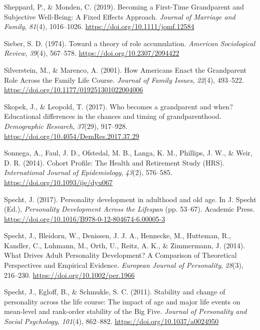 \documentclass[
  english,
  man,floatsintext]{apa7}
\begin{document}
\leavevmode\hypertarget{ref-sheppardBecomingFirstTimeGrandparent2019}{}%
Sheppard, P., \& Monden, C. (2019). Becoming a First-Time Grandparent and Subjective Well-Being: A Fixed Effects Approach. \emph{Journal of Marriage and Family}, \emph{81}(4), 1016--1026. \url{https://doi.org/10.1111/jomf.12584}

\leavevmode\hypertarget{ref-sieberTheoryRoleAccumulation1974}{}%
Sieber, S. D. (1974). Toward a theory of role accumulation. \emph{American Sociological Review}, \emph{39}(4), 567--578. \url{https://doi.org/10.2307/2094422}

\leavevmode\hypertarget{ref-silversteinHowAmericansEnact2001}{}%
Silverstein, M., \& Marenco, A. (2001). How Americans Enact the Grandparent Role Across the Family Life Course. \emph{Journal of Family Issues}, \emph{22}(4), 493--522. \url{https://doi.org/10.1177/019251301022004006}

\leavevmode\hypertarget{ref-skopekWhoBecomesGrandparent2017}{}%
Skopek, J., \& Leopold, T. (2017). Who becomes a grandparent and when? Educational differences in the chances and timing of grandparenthood. \emph{Demographic Research}, \emph{37}(29), 917--928. \url{https://doi.org/10.4054/DemRes.2017.37.29}

\leavevmode\hypertarget{ref-sonnegaCohortProfileHealth2014}{}%
Sonnega, A., Faul, J. D., Ofstedal, M. B., Langa, K. M., Phillips, J. W., \& Weir, D. R. (2014). Cohort Profile: The Health and Retirement Study (HRS). \emph{International Journal of Epidemiology}, \emph{43}(2), 576--585. \url{https://doi.org/10.1093/ije/dyu067}

\leavevmode\hypertarget{ref-spechtPersonalityDevelopmentAdulthood2017}{}%
Specht, J. (2017). Personality development in adulthood and old age. In J. Specht (Ed.), \emph{Personality Development Across the Lifespan} (pp. 53--67). Academic Press. \url{https://doi.org/10.1016/B978-0-12-804674-6.00005-3}

\leavevmode\hypertarget{ref-spechtWhatDrivesAdult2014}{}%
Specht, J., Bleidorn, W., Denissen, J. J. A., Hennecke, M., Hutteman, R., Kandler, C., Luhmann, M., Orth, U., Reitz, A. K., \& Zimmermann, J. (2014). What Drives Adult Personality Development? A Comparison of Theoretical Perspectives and Empirical Evidence. \emph{European Journal of Personality}, \emph{28}(3), 216--230. \url{https://doi.org/10.1002/per.1966}

\leavevmode\hypertarget{ref-spechtStabilityChangePersonality2011}{}%
Specht, J., Egloff, B., \& Schmukle, S. C. (2011). Stability and change of personality across the life course: The impact of age and major life events on mean-level and rank-order stability of the Big Five. \emph{Journal of Personality and Social Psychology}, \emph{101}(4), 862--882. \url{https://doi.org/10.1037/a0024950}
\end{document}
